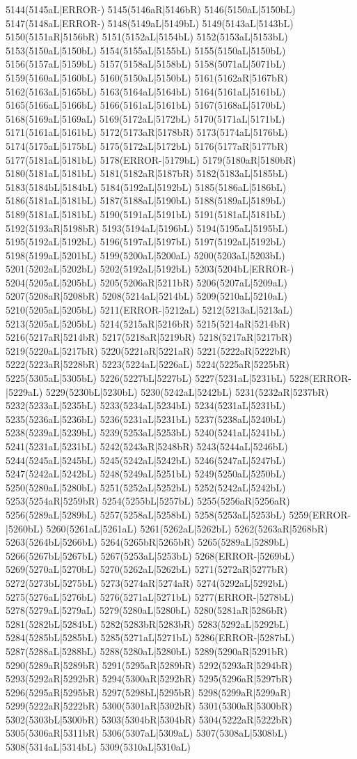 5144(5145aL|ERROR-) 5145(5146aR|5146bR) 5146(5150aL|5150bL) 5147(5148aL|ERROR-) 5148(5149aL|5149bL) 5149(5143aL|5143bL) 5150(5151aR|5156bR) 5151(5152aL|5154bL) 5152(5153aL|5153bL) 5153(5150aL|5150bL) 5154(5155aL|5155bL) 5155(5150aL|5150bL) 5156(5157aL|5159bL) 5157(5158aL|5158bL) 5158(5071aL|5071bL) 5159(5160aL|5160bL) 5160(5150aL|5150bL) 5161(5162aR|5167bR) 5162(5163aL|5165bL) 5163(5164aL|5164bL) 5164(5161aL|5161bL) 5165(5166aL|5166bL) 5166(5161aL|5161bL) 5167(5168aL|5170bL) 5168(5169aL|5169aL) 5169(5172aL|5172bL) 5170(5171aL|5171bL) 5171(5161aL|5161bL) 5172(5173aR|5178bR) 5173(5174aL|5176bL) 5174(5175aL|5175bL) 5175(5172aL|5172bL) 5176(5177aR|5177bR) 5177(5181aL|5181bL) 5178(ERROR-|5179bL) 5179(5180aR|5180bR) 5180(5181aL|5181bL) 5181(5182aR|5187bR) 5182(5183aL|5185bL) 5183(5184bL|5184bL) 5184(5192aL|5192bL) 5185(5186aL|5186bL) 5186(5181aL|5181bL) 5187(5188aL|5190bL) 5188(5189aL|5189bL) 5189(5181aL|5181bL) 5190(5191aL|5191bL) 5191(5181aL|5181bL) 5192(5193aR|5198bR) 5193(5194aL|5196bL) 5194(5195aL|5195bL) 5195(5192aL|5192bL) 5196(5197aL|5197bL) 5197(5192aL|5192bL) 5198(5199aL|5201bL) 5199(5200aL|5200aL) 5200(5203aL|5203bL) 5201(5202aL|5202bL) 5202(5192aL|5192bL) 5203(5204bL|ERROR-) 5204(5205aL|5205bL) 5205(5206aR|5211bR) 5206(5207aL|5209aL) 5207(5208aR|5208bR) 5208(5214aL|5214bL) 5209(5210aL|5210aL) 5210(5205aL|5205bL) 5211(ERROR-|5212aL) 5212(5213aL|5213aL) 5213(5205aL|5205bL) 5214(5215aR|5216bR) 5215(5214aR|5214bR) 5216(5217aR|5214bR) 5217(5218aR|5219bR) 5218(5217aR|5217bR) 5219(5220aL|5217bR) 5220(5221aR|5221aR) 5221(5222aR|5222bR) 5222(5223aR|5228bR) 5223(5224aL|5226aL) 5224(5225aR|5225bR) 5225(5305aL|5305bL) 5226(5227bL|5227bL) 5227(5231aL|5231bL) 5228(ERROR-|5229aL) 5229(5230bL|5230bL) 5230(5242aL|5242bL) 5231(5232aR|5237bR) 5232(5233aL|5235bL) 5233(5234aL|5234bL) 5234(5231aL|5231bL) 5235(5236aL|5236bL) 5236(5231aL|5231bL) 5237(5238aL|5240bL) 5238(5239aL|5239bL) 5239(5253aL|5253bL) 5240(5241aL|5241bL) 5241(5231aL|5231bL) 5242(5243aR|5248bR) 5243(5244aL|5246bL) 5244(5245aL|5245bL) 5245(5242aL|5242bL) 5246(5247aL|5247bL) 5247(5242aL|5242bL) 5248(5249aL|5251bL) 5249(5250aL|5250bL) 5250(5280aL|5280bL) 5251(5252aL|5252bL) 5252(5242aL|5242bL) 5253(5254aR|5259bR) 5254(5255bL|5257bL) 5255(5256aR|5256aR) 5256(5289aL|5289bL) 5257(5258aL|5258bL) 5258(5253aL|5253bL) 5259(ERROR-|5260bL) 5260(5261aL|5261aL) 5261(5262aL|5262bL) 5262(5263aR|5268bR) 5263(5264bL|5266bL) 5264(5265bR|5265bR) 5265(5289aL|5289bL) 5266(5267bL|5267bL) 5267(5253aL|5253bL) 5268(ERROR-|5269bL) 5269(5270aL|5270bL) 5270(5262aL|5262bL) 5271(5272aR|5277bR) 5272(5273bL|5275bL) 5273(5274aR|5274aR) 5274(5292aL|5292bL) 5275(5276aL|5276bL) 5276(5271aL|5271bL) 5277(ERROR-|5278bL) 5278(5279aL|5279aL) 5279(5280aL|5280bL) 5280(5281aR|5286bR) 5281(5282bL|5284bL) 5282(5283bR|5283bR) 5283(5292aL|5292bL) 5284(5285bL|5285bL) 5285(5271aL|5271bL) 5286(ERROR-|5287bL) 5287(5288aL|5288bL) 5288(5280aL|5280bL) 5289(5290aR|5291bR) 5290(5289aR|5289bR) 5291(5295aR|5289bR) 5292(5293aR|5294bR) 5293(5292aR|5292bR) 5294(5300aR|5292bR) 5295(5296aR|5297bR) 5296(5295aR|5295bR) 5297(5298bL|5295bR) 5298(5299aR|5299aR) 5299(5222aR|5222bR) 5300(5301aR|5302bR) 5301(5300aR|5300bR) 5302(5303bL|5300bR) 5303(5304bR|5304bR) 5304(5222aR|5222bR) 5305(5306aR|5311bR) 5306(5307aL|5309aL) 5307(5308aL|5308bL) 5308(5314aL|5314bL) 5309(5310aL|5310aL) 